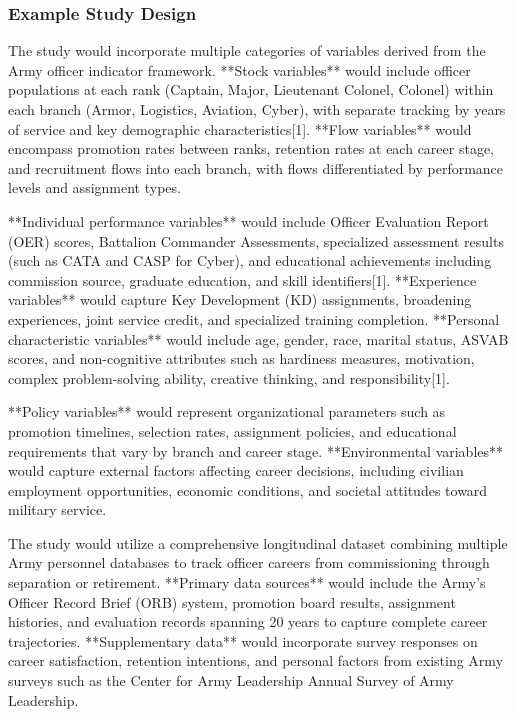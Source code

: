 \documentclass[main.tex]{subfiles}
\begin{document}
\subsubsection{Example Study Design}


The study would incorporate multiple categories of variables derived from the Army officer indicator framework. **Stock variables** would include officer populations at each rank (Captain, Major, Lieutenant Colonel, Colonel) within each branch (Armor, Logistics, Aviation, Cyber), with separate tracking by years of service and key demographic characteristics[1]. **Flow variables** would encompass promotion rates between ranks, retention rates at each career stage, and recruitment flows into each branch, with flows differentiated by performance levels and assignment types.

**Individual performance variables** would include Officer Evaluation Report (OER) scores, Battalion Commander Assessments, specialized assessment results (such as CATA and CASP for Cyber), and educational achievements including commission source, graduate education, and skill identifiers[1]. **Experience variables** would capture Key Development (KD) assignments, broadening experiences, joint service credit, and specialized training completion. **Personal characteristic variables** would include age, gender, race, marital status, ASVAB scores, and non-cognitive attributes such as hardiness measures, motivation, complex problem-solving ability, creative thinking, and responsibility[1].

**Policy variables** would represent organizational parameters such as promotion timelines, selection rates, assignment policies, and educational requirements that vary by branch and career stage. **Environmental variables** would capture external factors affecting career decisions, including civilian employment opportunities, economic conditions, and societal attitudes toward military service.


The study would utilize a comprehensive longitudinal dataset combining multiple Army personnel databases to track officer careers from commissioning through separation or retirement. **Primary data sources** would include the Army's Officer Record Brief (ORB) system, promotion board results, assignment histories, and evaluation records spanning 20 years to capture complete career trajectories. **Supplementary data** would incorporate survey responses on career satisfaction, retention intentions, and personal factors from existing Army surveys such as the Center for Army Leadership Annual Survey of Army Leadership.
\end{document}
